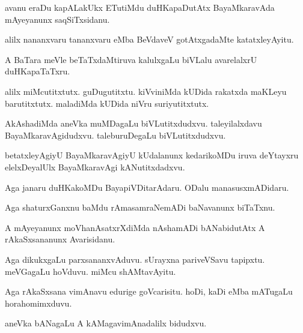 \documentclass{article}
\begin{document}
\begin{mn}%
avanu eraDu kapALakUkx ETutiMdu duHKapaDutAtx BayaMkaravAda mAyeyanunx saqSiTxsidanu.
\end{mn}

\begin{mn}%
alilx nananxvaru tananxvaru eMba BeVdaveV gotAtxgadaMte katatxleyAyitu.
\end{mn}

\begin{mn}%
A BaTara meVle beTaTxdaMtiruva kalulxgaLu biVLalu avarelalxrU duHKapaTaTxru.
\end{mn}

\begin{mn}%
alilx miMcutitxtutx. guDugutitxtu. kiVviniMda kUDida rakatxda maKLeyu barutitxtutx. maladiMda
kUDida niVru suriyutitxtutx.
\end{mn}

\begin{mn}%
AkAshadiMda aneVka muMDagaLu biVLutitxdudxvu. taleyilalxdavu BayaMkaravAgidudxvu. 
taleburuDegaLu biVLutitxdudxvu.
\end{mn}

\begin{mn}%
betatxleyAgiyU BayaMkaravAgiyU kUdalanunx kedarikoMDu iruva deYtayxru elelxDeyalUlx 
BayaMkaravAgi kANutitxdadxvu.
\end{mn}

\begin{mn}%
Aga janaru duHKakoMDu BayapiVDitarAdaru. ODalu manasusxmADidaru.
\end{mn}

\begin{mn}%
Aga shaturxGanxnu baMdu rAmasamraNemADi baNavanunx biTaTxnu.
\end{mn}

\begin{mn}%
A mAyeyanunx moVhanAsatxrXdiMda nAshamADi bANabidutAtx A rAkaSxsananunx Avarisidanu.
\end{mn}

\begin{mn}%
Aga dikukxgaLu parxsananxvAduvu. sUrayxna pariveVSavu tapipxtu. meVGagaLu hoVduvu. miMcu 
shAMtavAyitu.
\end{mn}

\begin{mn}%
Aga rAkaSxsana vimAnavu edurige goVcarisitu. hoDi, kaDi eMba mATugaLu horahomimxduvu.
\end{mn}

\begin{mn}%
aneVka bANagaLu A kAMagavimAnadalilx bidudxvu.
\end{mn}
\end{document}
